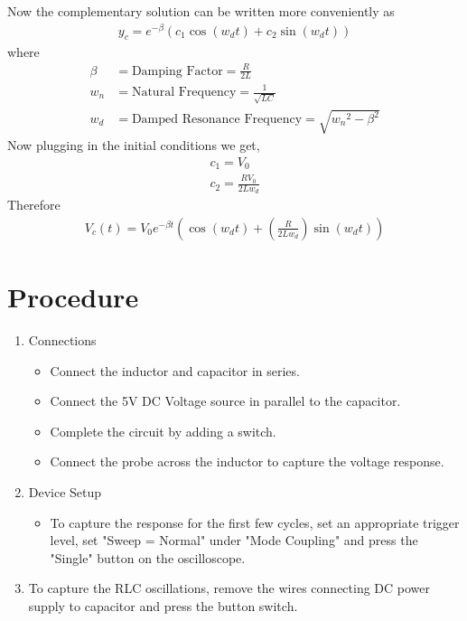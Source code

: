 \documentclass[a4paper,12pt]{article}
\begin{document}
Now the complementary solution can be written more conveniently as
\begin{align}
  y_c = e^{-\beta}(c_1 \cos(w_d t) + c_2 \sin(w_d t))
\end{align}
where
\begin{align}
  \beta &= \text{Damping Factor} = \frac{R}{2L}\\
  w_n &= \text{Natural Frequency} = \frac{1}{\sqrt{LC}}\\
  w_d &= \text{Damped Resonance Frequency} = \sqrt{{w_n}^2 - \beta ^ 2}
\end{align}
Now plugging in the initial conditions we get,
\begin{align}
  c_1 = V_0\\
  c_2 = \frac{RV_0}{2Lw_d}
\end{align}
Therefore 
\begin{align}
  V_c(t) = V_0e^{-\beta t}(\cos(w_d t) + \left(\frac{R}{2Lw_d}\right)\sin(w_d t))
\end{align}
\section{Procedure}
\begin{enumerate}
\item Connections
\begin{itemize}
\item Connect the inductor and capacitor in series.
\item Connect the 5V DC Voltage source in parallel to the capacitor.
\item Complete the circuit by adding a switch.
\item Connect the probe across the inductor to capture the voltage response.
\end{itemize}
\item Device Setup
\begin{itemize}
\item To capture the response for the first few cycles, set an appropriate trigger level, set "Sweep = Normal" under "Mode Coupling" and press the "Single" button on the oscilloscope.
\end{itemize}
\item To capture the RLC oscillations, remove the wires connecting DC power supply to capacitor and press the button switch.
\end{enumerate}
\end{document}
